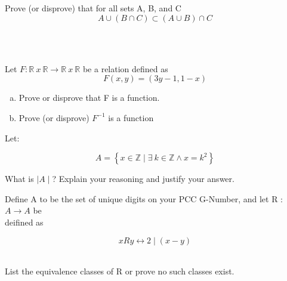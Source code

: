 \documentclass[10pt,letterpaper, cm]{hmcpset}
\begin{document}
\begin{problem}[3]
  Prove (or disprove) that for all sets A, B, and C\\
  \begin{equation*}
    A \cup (B \cap C) \subset (A \cup B) \cap C
  \end{equation*}
\end{problem}\\
\\
\begin{problem}[4]
  Let $F:\mathbb{R}~x~\mathbb{R} \rightarrow \mathbb{R}~x~\mathbb{R}$ 
  be a relation defined as\\
  \begin{equation*}
    F(x,y) = (3y-1,1-x)
  \end{equation*}
  \begin{center}
    \begin{enumerate}[(a)]
      \item Prove or disprove that F is a function.\\
      \item Prove (or disprove) $ F^{-1}$ is a function\\
    \end{enumerate}
  \end{center}
\end{problem}

\begin{problem}[5]
Let: \\
\begin{center}
  \begin{equation*}
    A= \left\{ x \in \mathbb{Z} \mid \exists~k \in \mathbb{Z} \land x = k^2 \right\}
  \end{equation*}
\end{center}
What is $\mid A \mid $? Explain your reasoning and justify your answer.
\end{problem}

\begin{problem}[6]
Define A to be the set of unique digits on your PCC G-Number, and let R :$A\rightarrow A$ be\\
deifined as\\
\begin{center}
  \begin{equation*}
    xRy \leftrightarrow 2\mid(x-y)
  \end{equation*}
\end{center}\\
List the equivalence classes of R or prove no such classes exist.
\end{problem}
\end{document}

